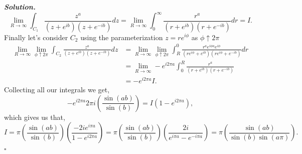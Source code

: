\documentclass[12pt]{report}
\newenvironment{solution}[1][\it{Solution}]{\textbf{#1. } }{$\square$}
\newcommand{\paren}[1]{{\left(#1\right)}} %
\begin{document}
\begin{solution}
    \[ 
        \lim_{R \to \infty} \int_{C_1} \frac{z^a}{(z+e^{ib})(z + e^{-ib})}dz = \lim_{R \to \infty} \int_0^\infty \frac{r^a}{(r + e^{ib})(r + e^{-ib})}dr = I.
    \]
    Finally let's consider $C_2$ using the parameterization $z = re^{i\phi}$ as $\phi \uparrow 2\pi$
    \begin{align*}
        \lim_{R \to \infty} \lim_{\phi \uparrow 2\pi} \int_{C_2} \frac{z^a}{(z + e^{ib})(z + e^{-ib})}dz &= \lim_{R \to \infty} \lim_{\phi \uparrow 2\pi} \int_R^0 \frac{r^a e^{i\phi a} e^{i\phi}}{(re^{i\phi} + e^{ib})(re^{i\phi} + e^{-ib})}dr\\
        &= \lim_{R \to \infty} -e^{i2\pi a} \int_0^R \frac{r^a}{(r + e^{ib})(r + e^{-ib})}\\
        &= -e^{i2\pi a} I.
    \end{align*} 
    Collecting all our integrals we get,
    \[ -e^{i2\pi a}2\pi i \paren{\frac{\sin(ab)}{\sin(b)}} = I(1 - e^{i2\pi a}),\]
    which gives us that,
    \[I = \pi \paren{\frac{\sin(ab)}{\sin(b)}}\paren{\frac{-2ie^{i\pi a}}{1 - e^{i2\pi a}}} = \pi\paren{\frac{\sin(ab)}{\sin(b)}}\paren{\frac{2i}{e^{i\pi a } - e^{-i\pi a}}} = \pi \paren{\frac{\sin(ab)}{\sin(b)\sin(a\pi)}}.\]
\end{solution}

\newpage
\end{document}
